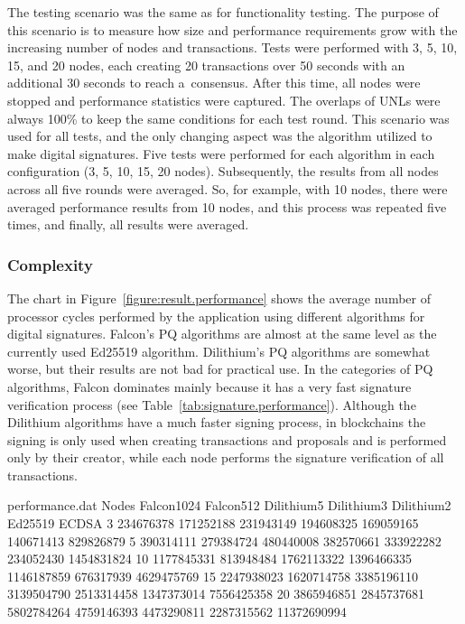 The testing scenario was the same as for functionality testing. The purpose of this scenario is to measure how size and performance requirements grow with the increasing number of nodes and transactions. Tests were performed with 3, 5, 10, 15, and 20 nodes, each creating 20 transactions over 50 seconds with an additional 30 seconds to reach a~consensus. After this time, all nodes were stopped and performance statistics were captured. The overlaps of UNLs were always 100\% to keep the same conditions for each test round. This scenario was used for all tests, and the only changing aspect was the algorithm utilized to make digital signatures. Five tests were performed for each algorithm in each configuration (3, 5, 10, 15, 20 nodes). Subsequently, the results from all nodes across all five rounds were averaged. So, for example, with 10 nodes, there were averaged performance results from 10 nodes, and this process was repeated five times, and finally, all results were averaged.

\subsubsection{Complexity}

The chart in Figure~\ref{figure:result.performance} shows the average number of processor cycles performed by the application using different algorithms for digital signatures. Falcon's PQ algorithms are almost at the same level as the currently used Ed25519 algorithm. Dilithium's PQ algorithms are somewhat worse, but their results are not bad for practical use. In the categories of PQ algorithms, Falcon dominates mainly because it has a very fast signature verification process (see Table~\ref{tab:signature.performance}). Although the Dilithium algorithms have a much faster signing process, in blockchains the signing is only used when creating transactions and proposals and is performed only by their creator, while each node performs the signature verification of all transactions.

\begin{filecontents}{performance.dat}
Nodes	Falcon1024	Falcon512	Dilithium5	Dilithium3	Dilithium2	Ed25519	ECDSA
3	234676378	171252188	231943149	194608325	169059165	140671413	829826879
5	390314111	279384724	480440008	382570661	333922282	234052430	1454831824
10	1177845331	813948484	1762113322	1396466335	1146187859	676317939	4629475769
15	2247938023	1620714758	3385196110	3139504790	2513314458	1347373014	7556425358
20	3865946851	2845737681	5802784264	4759146393	4473290811	2287315562	11372690994
\end{filecontents}


